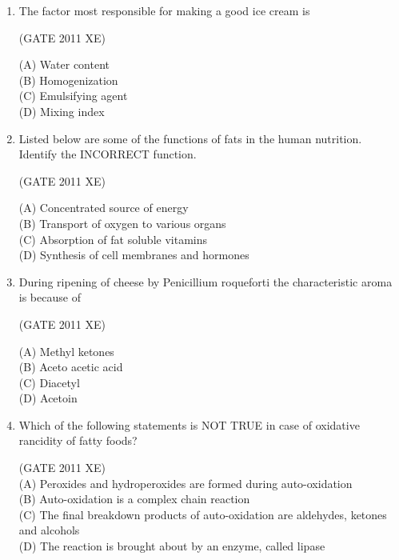 \documentclass[journal,12pt,onecolumn]{IEEEtran}
\begin{document}
\begin{enumerate}
\begin{enumerate}
\begin{enumerate}
\hfill{(GATE 2011 XE)} \\
\begin{multicols}{4}
(A) Albumin \\
(B) Zein \\
(C) Gluten \\
(D) Gliadin
\end{multicols}


\item The factor most responsible for making a good ice cream is

\hfill{(GATE 2011 XE)} \\
\begin{multicols}{4}
(A) Water content \\
(B) Homogenization \\
(C) Emulsifying agent \\
(D) Mixing index
\end{multicols}

\item Listed below are some of the functions of fats in the human nutrition. Identify the INCORRECT function.

\hfill{(GATE 2011 XE)} \\
\begin{multicols}{2}
(A) Concentrated source of energy \\
(B) Transport of oxygen to various organs \\
(C) Absorption of fat soluble vitamins \\
(D) Synthesis of cell membranes and hormones
\end{multicols}

\item During ripening of cheese by Penicillium roqueforti the characteristic aroma is because of

\hfill{(GATE 2011 XE)} \\
\begin{multicols}{4}
(A) Methyl ketones \\
(B) Aceto acetic acid \\
(C) Diacetyl \\
(D) Acetoin
\end{multicols}

\item Which of the following statements is NOT TRUE in case of oxidative rancidity of fatty foods?

\hfill{(GATE 2011 XE)} \\

(A) Peroxides and hydroperoxides are formed during auto-oxidation \\
(B) Auto-oxidation is a complex chain reaction \\
(C) The final breakdown products of auto-oxidation are aldehydes, ketones and alcohols \\
(D) The reaction is brought about by an enzyme, called lipase



\end{enumerate}
\end{enumerate}
\end{enumerate}
\end{document}
